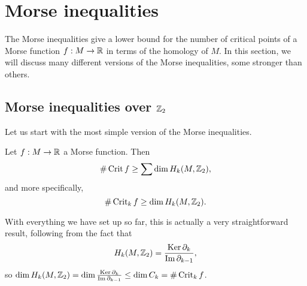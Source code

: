 \section{Morse inequalities}
The Morse inequalities give a lower bound for the number of critical points of a Morse function $f:M \to  \mathbb{R}$ in terms of the homology of $M$.
In this section, we will discuss many different versions of the Morse inequalities, some stronger than others.

\subsection{Morse inequalities over $\mathbb{Z}_2$}
Let us start with the most simple version of the Morse inequalities.

\begin{theorem}
    Let $f: M \to  \mathbb{R}$ a Morse function. Then
    \[
        \# \operatorname{Crit} f \ge \sum \dim H_k(M, \mathbb{Z}_2)
    ,\]
    and more specifically,
    \[
        \# \operatorname{Crit}_k f \ge \dim H_k(M, \mathbb{Z}_2)
    .\]
\end{theorem}
\begin{myproof}
    With everything we have set up so far, this is actually a very straightforward result, following from the fact that \[
    H_k(M, \mathbb{Z}_2) = \frac{\operatorname{Ker} \partial_k}{\operatorname{Im} \partial_{k-1}},
    \] so $\dim H_k(M, \mathbb{Z}_2) = \dim \frac{\operatorname{Ker} \partial_k}{\operatorname{Im} \partial_{k-1}} \le  \dim C_k = \# \operatorname{Crit}_k f$.
\end{myproof}

